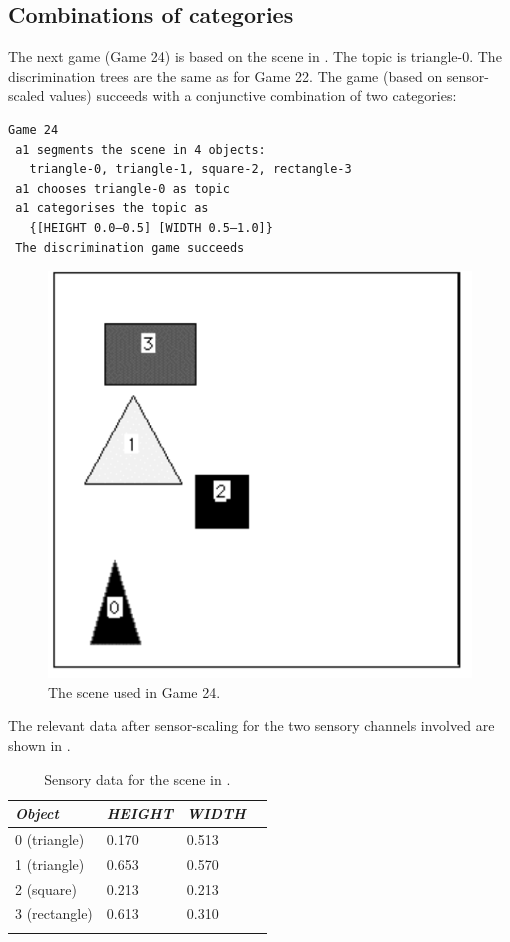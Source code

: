 \subsection{Combinations of categories}

The next game (Game 24) is based on the scene in 
. The topic is triangle-0. 
The discrimination trees are the same as for
Game 22. The game (based on sensor-scaled values)
succeeds with a conjunctive combination of two
categories: 
\begin{verbatim}
Game 24
 a1 segments the scene in 4 objects: 
   triangle-0, triangle-1, square-2, rectangle-3 
 a1 chooses triangle-0 as topic
 a1 categorises the topic as 
   {[HEIGHT 0.0–0.5] [WIDTH 0.5–1.0]}
 The discrimination game succeeds
\end{verbatim}

\begin{figure}[htbp]
  \centerline{\includegraphics[width=.40\textwidth]{chap4/figs/game24.pdf}}
\caption{\label{scene4}The scene used in Game 24.}
\end{figure}
The relevant data after sensor-scaling for the 
two sensory channels involved are shown in . 

\begin{table}
\begin{center}
\begin{tabular}{ l  l  l  l }
\lsptoprule
{\itshape Object} & {\itshape HEIGHT} & {\itshape WIDTH} \\ \midrule
0 (triangle) & 0.170 & 0.513  \\ 
1 (triangle) & 0.653 & 0.570 \\  
2 (square) & 0.213 & 0.213 \\  
3 (rectangle) & 0.613 & 0.310 \\  
\lspbottomrule
\end{tabular}
\caption{\label{tab:t-game24}Sensory data for the scene in .}
\end{center}
\end{table}

